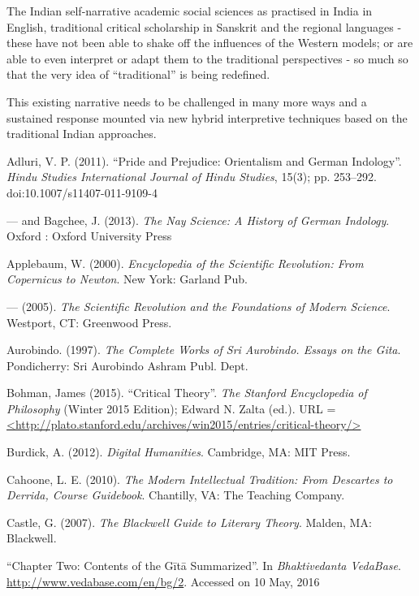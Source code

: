 The Indian self-narrative academic social sciences as practised in India in English, traditional critical scholarship in Sanskrit and the regional languages  - these have not been able to shake off the influences of the Western models; or are able to even interpret or adapt them to the traditional perspectives - so much so that the very idea of ``traditional'' is being redefined.

This existing narrative needs to be challenged in many more ways and a sustained response mounted via new hybrid interpretive techniques based on the traditional Indian approaches. 

\begin{thebibliography}{99}
\itemsep=2pt
Adluri, V. P. (2011). ``Pride and Prejudice: Orientalism and German Indology''. {\sl Hindu Studies International Journal of Hindu Studies}, 15(3); pp. 253--292. doi:10.1007/s11407-011-9109-4

--- and Bagchee, J. (2013). {\sl The Nay Science: A History of German Indology}. 
Oxford : Oxford University Press

Applebaum, W. (2000). {\sl Encyclopedia of the Scientific Revolution: From Copernicus to Newton}. New York: Garland Pub.

--- (2005). {\sl The Scientific Revolution and the Foundations of Modern Science}. Westport, CT: Greenwood Press.

Aurobindo. (1997). {\sl The Complete Works of Sri Aurobindo. Essays on the Gita}. Pondicherry: Sri Aurobindo Ashram Publ. Dept.

Bohman, James (2015). ``Critical Theory''. {\sl The Stanford Encyclopedia of Philosophy} (Winter 2015 Edition); Edward N. Zalta (ed.). URL = \url{<http://plato.stanford.edu/archives/win2015/entries/critical-theory/>}

Burdick, A. (2012). {\sl Digital Humanities}. Cambridge, MA: MIT Press.

Cahoone, L. E. (2010). {\sl The Modern Intellectual Tradition: From Descartes to Derrida, Course Guidebook}. Chantilly, VA: The Teaching Company.

Castle, G. (2007). {\sl The Blackwell Guide to Literary Theory}. Malden, MA: Blackwell.

``Chapter Two: Contents of the Gītā Summarized''. In {\sl Bhaktivedanta VedaBase}. \url{http://www.vedabase.com/en/bg/2}. Accessed on 10 May, 2016


\end{thebibliography}
